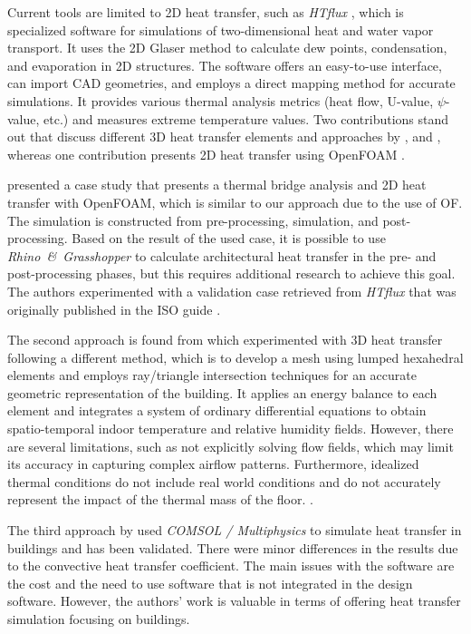 Current tools are limited to 2D heat transfer, such as \textit{HTflux} \cite{HTflux}, which is specialized software for simulations of two-dimensional heat and water vapor transport. 
It uses the 2D Glaser method \cite{glaser1959graphisches} to calculate dew points, condensation, and evaporation in 2D structures. 
The software offers an easy-to-use interface, can import CAD geometries, and employs a direct mapping method for accurate simulations. 
It provides various thermal analysis metrics (heat flow, U-value, $\psi$-value, etc.) and measures extreme temperature values. Two contributions stand out that discuss different 3D heat transfer elements and approaches by  \cite{Yang}, and \cite{COMSOL}, whereas one contribution presents 2D heat transfer using OpenFOAM \cite{kastner2020solving}.

\cite{kastner2020solving} presented a case study that presents a thermal bridge analysis and 2D heat transfer with OpenFOAM, which is similar to our approach due to the use of OF. The simulation is constructed from pre-processing, simulation, and post-processing. 
Based on the result of the used case, it is possible to use \textit{Rhino\ \&\ Grasshopper} to calculate architectural heat transfer in the pre- and post-processing phases, but this requires additional research to achieve this goal. 
The authors experimented with a validation case retrieved from \textit{HTflux} that was originally published in the ISO guide \cite{kastner2020solving,ISO}. 

The second approach is found from \cite{Yang} which experimented with 3D heat transfer following a different method, which is to develop a mesh using lumped hexahedral elements and employs ray/triangle intersection techniques for an accurate geometric representation of the building. 
It applies an energy balance to each element and integrates a system of ordinary differential equations to obtain spatio-temporal indoor temperature and relative humidity fields. 
However, there are several limitations, such as not explicitly solving flow fields, which may limit its accuracy in capturing complex airflow patterns. 
Furthermore, idealized thermal conditions do not include real world conditions and do not accurately represent the impact of the thermal mass of the floor. 
\cite{Yang}. 


The third approach by \cite{COMSOL} used \textit{COMSOL / Multiphysics} to simulate heat transfer in buildings and has been validated. There were minor differences in the results due to the convective heat transfer coefficient. 
The main issues with the software are the cost and the need to use software that is not integrated in the design software.
However, the authors' work is valuable in terms of offering heat transfer simulation focusing on buildings.  %

